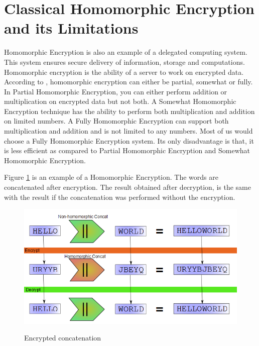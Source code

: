 \section{Classical Homomorphic Encryption and its Limitations}
Homomorphic Encryption is also an example of a delegated computing system. This system ensures secure delivery of information, storage and computations. Homomorphic encryption is the ability of a server to work on encrypted data. According to \citet{ogburn2013homomorphic}, homomorphic encryption can either be partial, somewhat or fully. In Partial Homomorphic Encryption, you can either perform addition or multiplication on encrypted data but not both. A Somewhat Homomorphic Encryption technique has the ability to perform both multiplication and addition on limited numbers. A Fully Homomorphic Encryption can support both multiplication and addition and is not limited to any numbers. Most of us would choose a Fully Homomorphic Encryption system. Its only disadvantage is that, it is less efficient as compared to Partial Homomorphic Encryption and Somewhat Homomorphic Encryption. 

Figure \ref{fig1 : Encrypt} is an example of a Homomorphic Encryption. The words are concatenated after encryption. The result obtained after decryption, is the same with the result if the concatenation was performed without the encryption.
\begin{figure}[!h]
\center
\includegraphics[scale= 0.5]{images/encrypt.png} 
\caption{Encrypted concatenation}
\label{fig1 : Encrypt}
\citep{Craig}
\end{figure}

